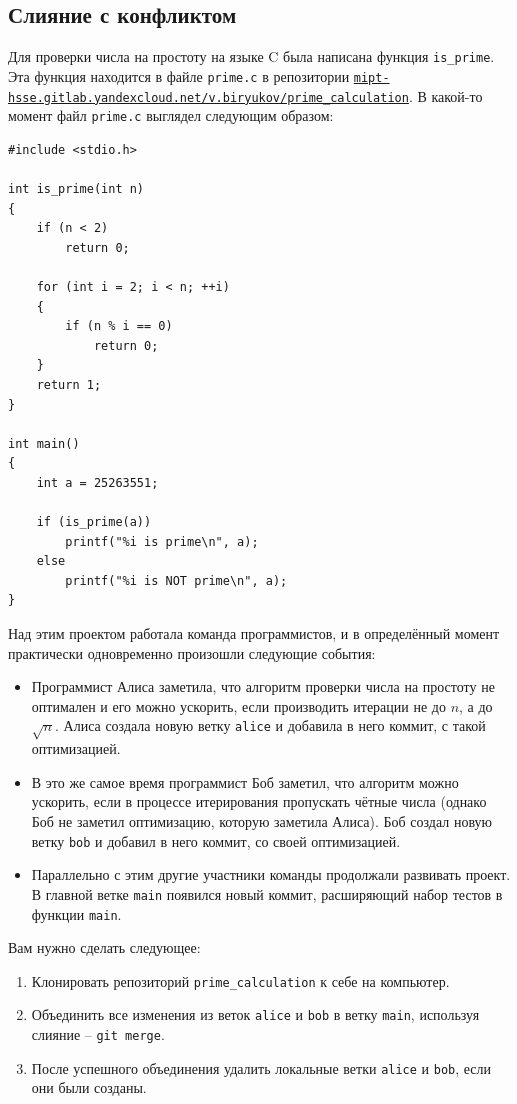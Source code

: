 \documentclass{article}
\begin{document}
\subsection{Слияние с конфликтом}
Для проверки числа на простоту на языке C была написана функция \texttt{is\_prime}. Эта функция находится в файле \texttt{prime.c} в репозитории \href{https://mipt-hsse.gitlab.yandexcloud.net/v.biryukov/prime_calculation}{\texttt{mipt-hsse.gitlab.yandexcloud.net/v.biryukov/prime\_calculation}}. В какой-то момент файл \texttt{prime.c} выглядел следующим образом:
\begin{lstlisting}
#include <stdio.h>

int is_prime(int n)
{
    if (n < 2) 
        return 0;

    for (int i = 2; i < n; ++i)
    {
        if (n % i == 0)
            return 0;
    }
    return 1;
}

int main()
{
    int a = 25263551;

    if (is_prime(a))
        printf("%i is prime\n", a);
    else
        printf("%i is NOT prime\n", a);
}
\end{lstlisting}
Над этим проектом работала команда программистов, и в определённый момент практически одновременно произошли следующие события:
\begin{itemize}
\item Программист Алиса заметила, что алгоритм проверки числа на простоту не оптимален и его можно ускорить, если производить итерации не до $n$, а до $\sqrt{n}$. Алиса создала новую ветку \texttt{alice} и добавила в него коммит, с такой оптимизацией.
\item В это же самое время программист Боб заметил, что алгоритм можно ускорить, если в процессе итерирования пропускать чётные числа (однако Боб не заметил оптимизацию, которую заметила Алиса). Боб создал новую ветку \texttt{bob} и добавил в него коммит, со своей оптимизацией.
\item Параллельно с этим другие участники команды продолжали развивать проект. В главной ветке \texttt{main} появился новый коммит, расширяющий набор тестов в функции \texttt{main}.
\end{itemize}
Вам нужно сделать следующее:
\begin{enumerate}
\item Клонировать репозиторий \texttt{prime\_calculation} к себе на компьютер.
\item Объединить все изменения из веток \texttt{alice} и \texttt{bob} в ветку \texttt{main}, используя слияние -- \texttt{git merge}.
\item После успешного объединения удалить локальные ветки \texttt{alice} и \texttt{bob}, если они были созданы.
\end{enumerate}
\end{document}
